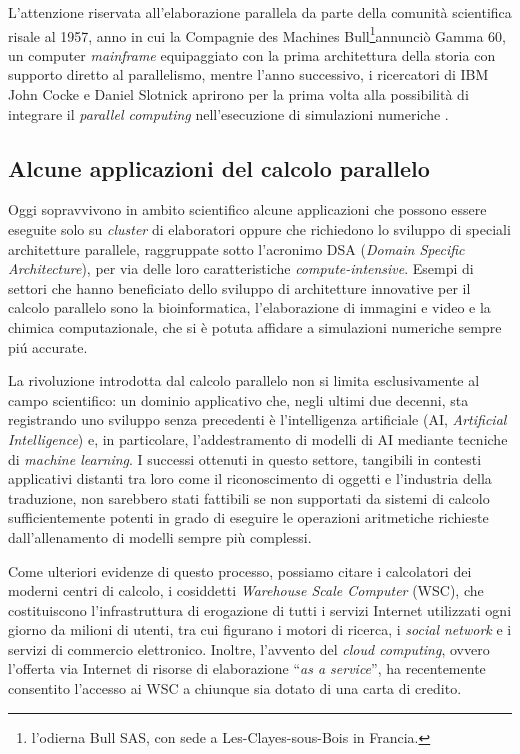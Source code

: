 \nocite{Hennessy2019}
L'attenzione riservata all'elaborazione parallela da parte della comunit\`a
scientifica risale al 1957, anno in cui la
Compagnie des Machines Bull\footnote{l'odierna Bull SAS, con sede a Les-Clayes-sous-Bois in Francia.}annunci\`o Gamma 60, un computer \textit{mainframe}
equipaggiato con la prima architettura della storia con supporto diretto
al parallelismo, mentre l'anno successivo, i ricercatori di IBM John
Cocke e Daniel Slotnick aprirono per la prima volta alla
possibilit\`a di integrare il \textit{parallel computing} nell'esecuzione di simulazioni numeriche \cite{Wilson1994}.

\subsection{Alcune applicazioni del calcolo parallelo}
Oggi sopravvivono in ambito scientifico alcune applicazioni
che possono essere eseguite
solo su \textit{cluster} di elaboratori oppure che richiedono lo sviluppo di speciali architetture parallele, raggruppate sotto l'acronimo DSA (\textit{Domain Specific Architecture}), per via delle loro caratteristiche \textit{compute-intensive}.\newline
Esempi di settori che hanno beneficiato dello sviluppo di
architetture innovative per il calcolo parallelo sono la
bioinformatica, l'elaborazione di immagini e video
e la chimica computazionale, che si \`e potuta affidare a simulazioni
numeriche sempre pi\'u accurate.

La rivoluzione introdotta dal calcolo parallelo non si limita esclusivamente al campo scientifico: un dominio applicativo che, negli ultimi due decenni, sta registrando uno sviluppo senza precedenti \`e l'intelligenza artificiale (AI, \textit{Artificial Intelligence}) e, in particolare, l'addestramento di modelli di AI mediante tecniche di \textit{machine learning}. \newline
I successi ottenuti in questo settore, tangibili in contesti applicativi distanti tra loro come il riconoscimento di oggetti e l'industria della traduzione, non sarebbero stati fattibili se non supportati da sistemi di calcolo sufficientemente potenti in grado di eseguire le operazioni aritmetiche richieste dall'allenamento di modelli sempre pi\`u complessi.

Come ulteriori evidenze di questo processo, possiamo citare i calcolatori dei moderni centri di calcolo, i cosiddetti \textit{Warehouse Scale Computer} (WSC), che costituiscono l'infrastruttura di erogazione di tutti i servizi Internet utilizzati ogni giorno da milioni di utenti, tra cui figurano i motori di ricerca, i \textit{social network} e i servizi di commercio elettronico.\newline
Inoltre, l'avvento del \textit{cloud computing}, ovvero l'offerta via Internet di risorse di elaborazione \enquote{\textit{as a service}}, ha recentemente consentito l'accesso ai WSC a chiunque sia dotato di una carta di credito.
